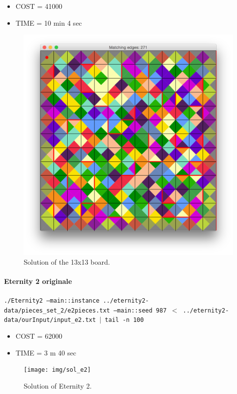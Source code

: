 	\begin{itemize}
		\item COST = 41000
		\item TIME = 10 min 4 sec
	\end{itemize}
	\begin{figure}[H]
	\centering
	\includegraphics[scale=0.25]{img/sol_13x13}
	\caption{Solution of the 13x13 board.}
	\end{figure}



	\paragraph{Eternity 2 originale}
	\texttt{./Eternity2 --main::instance ../eternity2-data/pieces\_set\_2/e2pieces.txt --main::seed 987 $<$ ../eternity2-data/ourInput/input\_e2.txt $\mid$ tail -n 100}

	\begin{itemize}
		\item COST = 62000
		\item TIME = 3 m 40 sec
	\end{itemize}
	\begin{figure}[H]
	\centering
	\texttt{[image: img/sol\_e2]}
	\caption{Solution of Eternity 2.}
	\end{figure}














